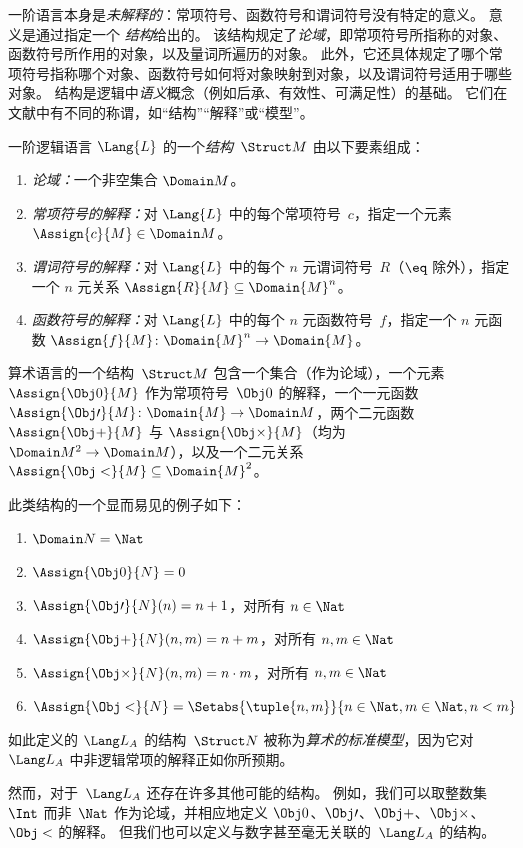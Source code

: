\documentclass[../../../include/open-logic-section]{subfiles}
\begin{document}


\begin{explain}
一阶语言本身是\emph{未解释的}：常项符号、函数符号和谓词符号没有特定的意义。
意义是通过指定一个 \emph{结构}给出的。
该结构规定了\emph{论域}，即常项符号所指称的对象、函数符号所作用的对象，以及量词所遍历的对象。
此外，它还具体规定了哪个常项符号指称哪个对象、函数符号如何将对象映射到对象，以及谓词符号适用于哪些对象。
结构是逻辑中\emph{语义}概念（例如后承、有效性、可满足性）的基础。
它们在文献中有不同的称谓，如“结构”“解释”或“模型”。
\end{explain}

\begin{defn}[结构]
 一阶逻辑语言 $\Lang{L}$ 的一个\emph{结构}~$\Struct M$ 由以下要素组成：
\begin{enumerate}
\item \emph{论域：}一个非空集合 $\Domain M$。
\item \emph{常项符号的解释：}对 $\Lang{L}$ 中的每个常项符号~$c$，指定一个元素 $\Assign{c}{M} \in \Domain M$。
\item \emph{谓词符号的解释：}对 $\Lang{L}$ 中的每个 $n$ 元谓词符号~$R$（$\eq$ 除外），指定一个 $n$ 元关系 $\Assign{R}{M} \subseteq \Domain{M}^n$。
\item \emph{函数符号的解释：}对 $\Lang{L}$ 中的每个 $n$ 元函数符号~$f$，指定一个 $n$ 元函数 $\Assign{f}{M}
  \colon \Domain{M}^n \to \Domain{M}$。
\end{enumerate}
\end{defn}

\begin{ex}
算术语言的一个结构~$\Struct M$ 包含一个集合（作为论域），一个元素 $\Assign{\Obj 0}{M}$ 作为常项符号~$\Obj 0$ 的解释，一个一元函数 $\Assign{\Obj \prime}{M} \colon \Domain{M} \to \Domain M$，两个二元函数 $\Assign{\Obj +}{M}$ 与 $\Assign{\Obj
    \times}{M}$（均为 $\Domain M^2 \to \Domain M$），以及一个二元关系 $\Assign{\Obj <}{M} \subseteq \Domain{M}^2$。

此类结构的一个显而易见的例子如下：
\begin{enumerate}
\item $\Domain N = \Nat$
\item $\Assign{\Obj 0}{N} = 0$
\item $\Assign{\Obj \prime}{N}(n) = n + 1$，对所有 $n \in \Nat$
\item $\Assign{\Obj +}{N}(n, m) = n + m$，对所有 $n, m \in \Nat$
\item $\Assign{\Obj \times}{N}(n, m) = n\cdot m$，对所有 $n, m \in \Nat$
\item $\Assign{\Obj <}{N} = \Setabs{\tuple{n, m}}{n \in \Nat, m \in
  \Nat, n < m}$
\end{enumerate}
如此定义的 $\Lang L_A$ 的结构~$\Struct N$ 被称为\emph{算术的标准模型}，因为它对~$\Lang L_A$ 中非逻辑常项的解释正如你所预期。

然而，对于~$\Lang L_A$ 还存在许多其他可能的结构。
例如，我们可以取整数集~$\Int$ 而非~$\Nat$ 作为论域，并相应地定义 $\Obj 0$、$\Obj \prime$、$\Obj +$、$\Obj \times$、$\Obj <$ 的解释。
但我们也可以定义与数字甚至毫无关联的~$\Lang L_A$ 的结构。
\end{ex}
\end{document}
